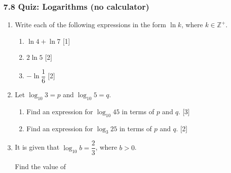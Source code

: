 \documentclass[12pt, twoside]{article}
\begin{document}
\subsubsection*{7.8 Quiz: Logarithms (no calculator)}

\begin{enumerate}[itemsep=0.1cm]

\item[1.] [Maximum mark: 5]

Write each of the following expressions in the form $\ln k$, where
$k \in \mathbb{Z}^{+}$.

\begin{enumerate}[itemsep=0.1cm]
  \item $\ln 4 + \ln 7$ \hfill [1]
  \item $2\ln 5$ \hfill [2]
  \item $-\ln\dfrac{1}{6}$ \hfill [2]
\end{enumerate}


\medskip

\item[2.] [Maximum mark: 5]

Let $\log_{10} 3 = p$ and $\log_{10} 5 = q$.

\begin{enumerate}[itemsep=0.1cm]
  \item Find an expression for $\log_{10} 45$ in terms of $p$ and $q$.
  \hfill [3]
  \item Find an expression for $\log_{3} 25$ in terms of $p$ and $q$.
  \hfill [2]
\end{enumerate}


\newpage

\item[3.] [Maximum mark: 5]

It is given that $\log_{10} b = \dfrac{2}{3}$, where $b > 0$.

Find the value of


\end{enumerate}
\end{document}
